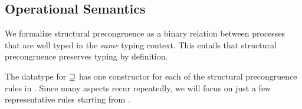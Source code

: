 \subsection{Operational Semantics}
\label{sec:semantics-agda}

We formalize structural precongruence as a binary relation between processes
that are well typed in the \emph{same} typing context. This entails that
structural precongruence preserves typing by definition.

\begin{AgdaAlign}
\begin{code}%
\>[0]\AgdaSpace{}%
\AgdaSpace{}%
\AgdaSymbol{:}\AgdaSpace{}%
\AgdaSymbol{\}}\AgdaSpace{}%
\AgdaSpace{}%
\AgdaSpace{}%
\AgdaSpace{}%
\AgdaSpace{}%
\AgdaSpace{}%
\AgdaSpace{}%
\AgdaSpace{}%
\AgdaSpace{}%
\<%
\end{code}

The datatype for $\sqsupseteq$ has one constructor for each of the structural
precongruence rules in . Since many aspects recur
repeatedly, we will focus on just a few representative rules starting from
\SComm.

\begin{code}%
\>[0][@{}l@{\AgdaIndent{1}}]%
\>[2]\AgdaSpace{}%
\AgdaSymbol{:}\<%
\\
\>[2][@{}l@{\AgdaIndent{0}}]%
\>[4]\AgdaSpace{}%
\AgdaSpace{}%
\AgdaSpace{}%
\AgdaSpace{}%
\AgdaSpace{}%
\AgdaSpace{}%
\AgdaSymbol{\}}\AgdaSpace{}%
\AgdaSymbol{(}\AgdaSpace{}%
\AgdaSymbol{:}\AgdaSpace{}%
\AgdaSpace{}%
\AgdaSpace{}%
\AgdaSymbol{)}\AgdaSpace{}%
\AgdaSymbol{(}\AgdaSpace{}%
\AgdaSymbol{:}\AgdaSpace{}%
\AgdaSpace{}%
\AgdaSpace{}%
\AgdaSpace{}%
\AgdaOperator{\AgdaDatatype{+}}\AgdaSpace{}%
\AgdaSymbol{)}\AgdaSpace{}%
\<%
\\
%
\>[4]\AgdaSpace{}%
\AgdaSpace{}%
\AgdaSpace{}%
\AgdaSpace{}%
\AgdaSpace{}%
\AgdaSpace{}%
\AgdaSpace{}%
\AgdaSymbol{(}\AgdaSpace{}%
\AgdaSymbol{)}\AgdaSpace{}%
\AgdaSymbol{(}\AgdaSpace{}%
\AgdaSymbol{)}\AgdaSpace{}%
\AgdaSpace{}%
\<%
\end{code}


\end{AgdaAlign}

